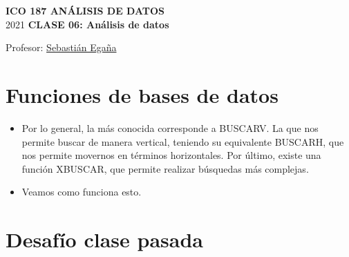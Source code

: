 \documentclass[12 pt,letterpaper]{article}
\begin{document}
%

	
	\pagestyle{fancy}
	\fancyhf{}
	\renewcommand{\headrulewidth}{0pt}
	\renewcommand{\footrulewidth}{0pt}	
	
\begin{center}
		
	\bigbreak
	\textbf{ICO 187 ANÁLISIS DE DATOS}\\
	\small{2021}
	\break
	\textbf{CLASE 06: Análisis de datos}\\
\end{center}

\begin{flushright}	
		
	Profesor: \href{mailto:sebastianeganasa@santotomas.cl}{Sebastián Egaña}

\end{flushright}

\section{Funciones de bases de datos}

\begin{itemize}
	\item Por lo general, la más conocida corresponde a BUSCARV. La que nos permite buscar de manera vertical, teniendo su equivalente BUSCARH, que nos permite movernos en términos horizontales. Por último, existe una función XBUSCAR, que permite realizar búsquedas más complejas.

	\item Veamos como funciona esto. 	
\end{itemize}
	
\section{Desafío clase pasada \faWarning}
\end{document}
